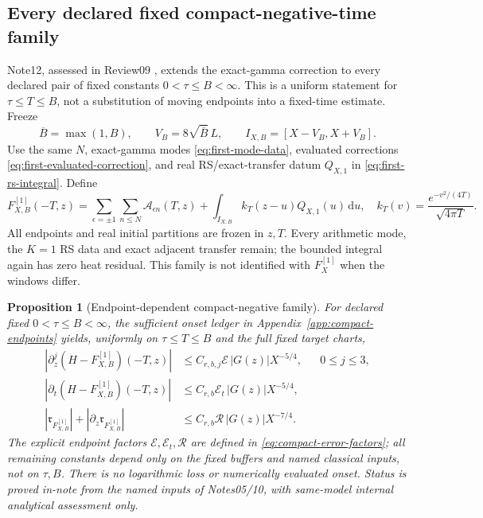 \documentclass[11pt]{article}
\newcommand{\dd}{\,\mathrm d}
\newtheorem{proposition}{Proposition}[section]
\numberwithin{equation}{section}
\begin{document}
\subsection{Every declared fixed compact-negative-time family}
\label{sec:compact-negative-family}
Note12, assessed in Review09 \cite{ansatz12,review09}, extends the
exact-gamma correction to every declared pair of fixed constants
\(0<\tau\le B<\infty\). This is a uniform statement for
\(\tau\le T\le B\), not a substitution of moving endpoints into a
fixed-time estimate. Freeze
\begin{equation}
 \overline B=\max(1,B),\qquad V_B=8\sqrt{\overline B}\,L,
 \qquad I_{X,B}=[X-V_B,X+V_B].
 \label{eq:compact-negative-window}
\end{equation}
Use the same \(N\), exact-gamma modes
\eqref{eq:first-mode-data}, evaluated corrections
\eqref{eq:first-evaluated-correction}, and real RS/exact-transfer
datum \(Q_{X,1}\) in \eqref{eq:first-rs-integral}. Define
\begin{equation}
 F_{X,B}^{[1]}(-T,z)=\sum_{\epsilon=\pm1}\sum_{n\le N}
 \mathcal A_{\epsilon n}(T,z)
 +\int_{I_{X,B}} k_T(z-u)Q_{X,1}(u)\dd u,
 \quad k_T(v)=\frac{e^{-v^2/(4T)}}{\sqrt{4\pi T}}.
 \label{eq:compact-negative-model}
\end{equation}
All endpoints and real initial partitions are frozen in \(z,T\).
Every arithmetic mode, the \(K=1\) RS data and exact adjacent transfer
remain; the bounded integral again has zero heat residual. This family
is not identified with \(F_X^{[1]}\) when the windows differ.

\begin{proposition}[Endpoint-dependent compact-negative family]
\label{prop:compact-negative-family}
For declared fixed \(0<\tau\le B<\infty\), the sufficient onset
ledger in Appendix~\ref{app:compact-endpoints} yields, uniformly on
\(\tau\le T\le B\) and the full fixed target charts,
\begin{align}
 |\partial_z^j(H-F_{X,B}^{[1]})(-T,z)|
   &\le C_{r,b,j}\mathcal E\,|G(z)|X^{-5/4},&&0\le j\le3,\\
 |\partial_t(H-F_{X,B}^{[1]})(-T,z)|
   &\le C_{r,b}\mathcal E_t\,|G(z)|X^{-5/4},\\
 |\mathfrak r_{F_{X,B}^{[1]}}|
       +|\partial_z\mathfrak r_{F_{X,B}^{[1]}}|
   &\le C_{r,b}\mathcal R\,|G(z)|X^{-7/4}.
 \label{eq:compact-negative-bounds}
\end{align}
The explicit endpoint factors \(\mathcal E,\mathcal E_t,\mathcal R\)
are defined in \eqref{eq:compact-error-factors}; all remaining constants
depend only on the fixed buffers and named classical inputs, not on
\(\tau,B\). There is no logarithmic loss or numerically evaluated
onset. Status is proved in-note from the named inputs of Notes05/10,
with same-model internal analytical assessment only.
\end{proposition}
\end{document}
